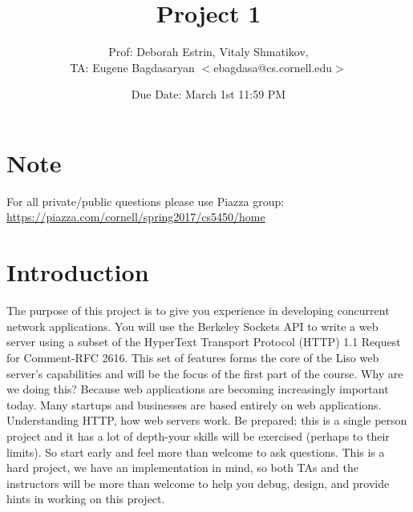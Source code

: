 \documentclass[12pt]{article}
\title{Project 1}
\author{Prof: Deborah Estrin, Vitaly Shmatikov, \\ TA: Eugene Bagdasaryan $<$ebagdasa@cs.cornell.edu$>$ \\ }
\date{Due Date: March 1st 11:59 PM}
\begin{document}
\maketitle

\section{Note}

For all private/public questions please use Piazza group: \url{https://piazza.com/cornell/spring2017/cs5450/home}

\section{Introduction}
The purpose of this project is to give you experience in developing concurrent network applications. You will use the Berkeley Sockets API to write a web server using a subset of the HyperText Transport Protocol (HTTP) 1.1 Request for Comment-RFC 2616. This set of features forms the core of the Liso web server’s capabilities and will be the focus of the first part of the course.
Why are we doing this? Because web applications are becoming increasingly important today. Many startups and businesses are based entirely on web applications. Understanding HTTP, how web servers work.
Be prepared: this is a single person project and it has a lot of depth-your skills will be exercised (perhaps to their limits). So start early and feel more than welcome to ask questions. This is a hard project, we have an implementation in mind, so both TAs and the instructors will be more than welcome to help you debug, design, and provide hints in working on this project.
\end{document}
